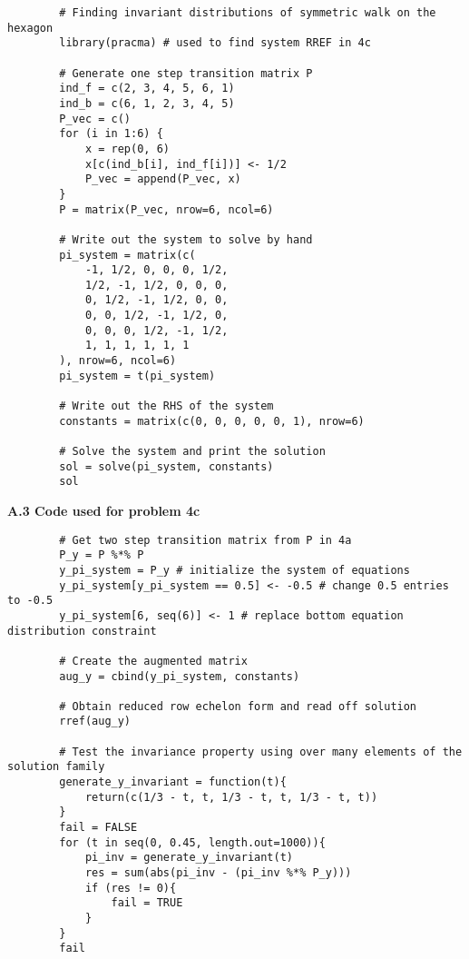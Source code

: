 \documentclass[11pt, letterpaper]{article}
\begin{document}
    \begin{verbatim}
        # Finding invariant distributions of symmetric walk on the hexagon
        library(pracma) # used to find system RREF in 4c

        # Generate one step transition matrix P
        ind_f = c(2, 3, 4, 5, 6, 1)
        ind_b = c(6, 1, 2, 3, 4, 5)
        P_vec = c()
        for (i in 1:6) {
            x = rep(0, 6)
            x[c(ind_b[i], ind_f[i])] <- 1/2
            P_vec = append(P_vec, x)
        }
        P = matrix(P_vec, nrow=6, ncol=6)

        # Write out the system to solve by hand
        pi_system = matrix(c(
            -1, 1/2, 0, 0, 0, 1/2,
            1/2, -1, 1/2, 0, 0, 0,
            0, 1/2, -1, 1/2, 0, 0,
            0, 0, 1/2, -1, 1/2, 0,
            0, 0, 0, 1/2, -1, 1/2,
            1, 1, 1, 1, 1, 1
        ), nrow=6, ncol=6)
        pi_system = t(pi_system)

        # Write out the RHS of the system
        constants = matrix(c(0, 0, 0, 0, 0, 1), nrow=6)

        # Solve the system and print the solution
        sol = solve(pi_system, constants)
        sol
    \end{verbatim}
    {\bf A.3 Code used for problem 4c}
    \begin{verbatim}
        # Get two step transition matrix from P in 4a
        P_y = P %*% P
        y_pi_system = P_y # initialize the system of equations
        y_pi_system[y_pi_system == 0.5] <- -0.5 # change 0.5 entries to -0.5
        y_pi_system[6, seq(6)] <- 1 # replace bottom equation distribution constraint

        # Create the augmented matrix
        aug_y = cbind(y_pi_system, constants)

        # Obtain reduced row echelon form and read off solution
        rref(aug_y)

        # Test the invariance property using over many elements of the solution family 
        generate_y_invariant = function(t){
            return(c(1/3 - t, t, 1/3 - t, t, 1/3 - t, t))
        }
        fail = FALSE
        for (t in seq(0, 0.45, length.out=1000)){
            pi_inv = generate_y_invariant(t) 
            res = sum(abs(pi_inv - (pi_inv %*% P_y)))
            if (res != 0){
                fail = TRUE
            }
        }
        fail
    \end{verbatim}
\end{document}

